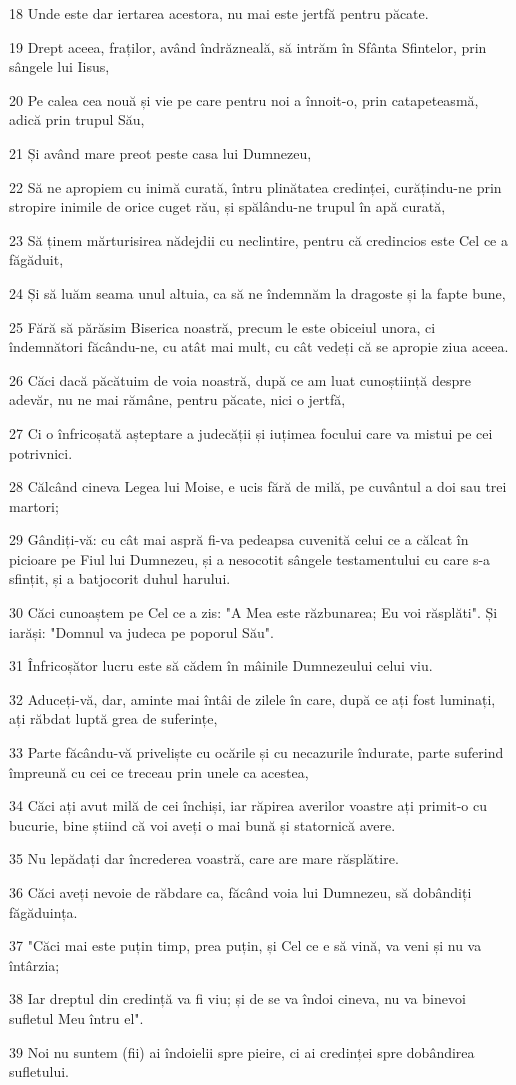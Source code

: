 \par 18 Unde este dar iertarea acestora, nu mai este jertfă pentru păcate.
\par 19 Drept aceea, fraților, având îndrăzneală, să intrăm în Sfânta Sfintelor, prin sângele lui Iisus,
\par 20 Pe calea cea nouă și vie pe care pentru noi a înnoit-o, prin catapeteasmă, adică prin trupul Său,
\par 21 Și având mare preot peste casa lui Dumnezeu,
\par 22 Să ne apropiem cu inimă curată, întru plinătatea credinței, curățindu-ne prin stropire inimile de orice cuget rău, și spălându-ne trupul în apă curată,
\par 23 Să ținem mărturisirea nădejdii cu neclintire, pentru că credincios este Cel ce a făgăduit,
\par 24 Și să luăm seama unul altuia, ca să ne îndemnăm la dragoste și la fapte bune,
\par 25 Fără să părăsim Biserica noastră, precum le este obiceiul unora, ci îndemnători făcându-ne, cu atât mai mult, cu cât vedeți că se apropie ziua aceea.
\par 26 Căci dacă păcătuim de voia noastră, după ce am luat cunoștiință despre adevăr, nu ne mai rămâne, pentru păcate, nici o jertfă,
\par 27 Ci o înfricoșată așteptare a judecății și iuțimea focului care va mistui pe cei potrivnici.
\par 28 Călcând cineva Legea lui Moise, e ucis fără de milă, pe cuvântul a doi sau trei martori;
\par 29 Gândiți-vă: cu cât mai aspră fi-va pedeapsa cuvenită celui ce a călcat în picioare pe Fiul lui Dumnezeu, și a nesocotit sângele testamentului cu care s-a sfințit, și a batjocorit duhul harului.
\par 30 Căci cunoaștem pe Cel ce a zis: "A Mea este răzbunarea; Eu voi răsplăti". Și iarăși: "Domnul va judeca pe poporul Său".
\par 31 Înfricoșător lucru este să cădem în mâinile Dumnezeului celui viu.
\par 32 Aduceți-vă, dar, aminte mai întâi de zilele în care, după ce ați fost luminați, ați răbdat luptă grea de suferințe,
\par 33 Parte făcându-vă priveliște cu ocările și cu necazurile îndurate, parte suferind împreună cu cei ce treceau prin unele ca acestea,
\par 34 Căci ați avut milă de cei închiși, iar răpirea averilor voastre ați primit-o cu bucurie, bine știind că voi aveți o mai bună și statornică avere.
\par 35 Nu lepădați dar încrederea voastră, care are mare răsplătire.
\par 36 Căci aveți nevoie de răbdare ca, făcând voia lui Dumnezeu, să dobândiți făgăduința.
\par 37 "Căci mai este puțin timp, prea puțin, și Cel ce e să vină, va veni și nu va întârzia;
\par 38 Iar dreptul din credință va fi viu; și de se va îndoi cineva, nu va binevoi sufletul Meu întru el".
\par 39 Noi nu suntem (fii) ai îndoielii spre pieire, ci ai credinței spre dobândirea sufletului.

